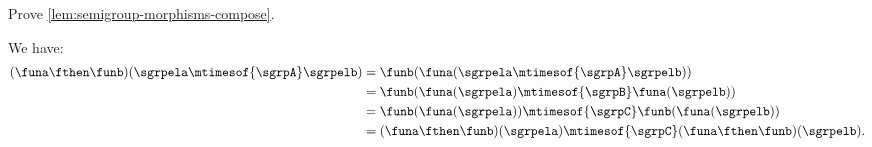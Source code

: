 \begin{exercise}
    Prove \cref{lem:semigroup-morphisms-compose}.
\end{exercise}
\begin{solution}
    We have:
    \begin{equation}
        \begin{aligned}
            (\funa \fthen \funb)(\sgrpela \mtimesof{\sgrpA} \sgrpelb)
             & =\funb(\funa(\sgrpela \mtimesof{\sgrpA} \sgrpelb)) \\
             & =\funb(\funa(\sgrpela)\mtimesof{\sgrpB}\funa(\sgrpelb)) \\
             & =\funb(\funa(\sgrpela))\mtimesof{\sgrpC} \funb(\funa(\sgrpelb)) \\
             & =(\funa \fthen \funb)(\sgrpela) \mtimesof{\sgrpC} (\funa \fthen \funb)(\sgrpelb).
        \end{aligned}
    \end{equation}
\end{solution}


